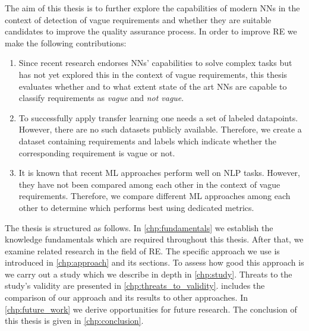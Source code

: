 The aim of this thesis is to further explore the capabilities of modern \acp{NN} in the context of detection of vague requirements and whether they are suitable candidates to improve the quality assurance process.
In order to improve \ac{RE} we make the following contributions:
\begin{enumerate}
    \item Since recent research endorses \acp{NN}' capabilities to solve complex tasks but has not yet explored this in the context of vague requirements, this thesis evaluates whether and to what extent state of the art \acp{NN} are capable to classify requirements as \textit{vague} and \textit{not vague}.
    \item To successfully apply transfer learning one needs a set of labeled datapoints. However, there are no such datasets publicly available.
        Therefore, we create a dataset containing requirements and labels which indicate whether the corresponding requirement is vague or not.
    \item It is known that recent \ac{ML} approaches perform well on \ac{NLP} tasks.
        However, they have not been compared among each other in the context of vague requirements.
        Therefore, we compare different \ac{ML} approaches among each other to determine which performs best using dedicated metrics.
\end{enumerate}

The thesis is structured as follows.
In \cref{chp:fundamentals} we establish the knowledge fundamentals which are required throughout this thesis.
After that, we examine related research in the field of \ac{RE}.
The specific approach we use is introduced in \cref{chp:approach} and its sections.
To assess how good this approach is we carry out a study which we describe in depth in \cref{chp:study}.
Threats to the study's validity are presented in \cref{chp:threats_to_validity}.
 includes the comparison of our approach and its results to other approaches.
In \cref{chp:future_work} we derive opportunities for future research.
The conclusion of this thesis is given in \cref{chp:conclusion}.
